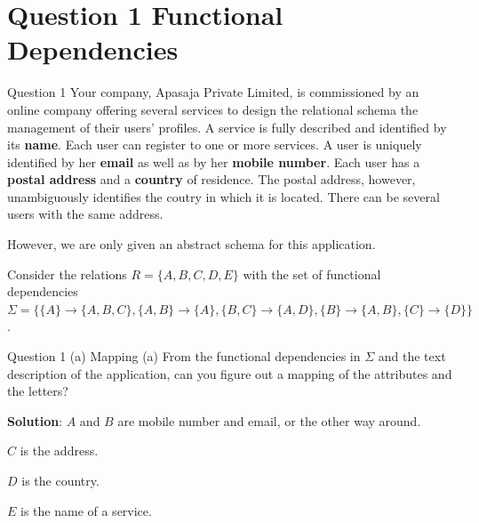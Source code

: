 \section*{Question 1 Functional Dependencies}

\begin{frame}[fragile]{Question 1}
Your company, Apasaja Private Limited, is commissioned by an online company offering several services to design the relational schema the management of their users' profiles. A service is fully described and identified by its \textbf{name}. Each user can register to one or more services. A user is uniquely identified by her \textbf{email} as well as by her \textbf{mobile number}. Each user has a \textbf{postal address} and a \textbf{country} of residence. The postal address, however, unambiguously identifies the coutry in which it is located. There can be several users with the same address.\vspace{5pt}

However, we are only given an abstract schema for this application. \vspace{5pt}

Consider the relations $R=\{A, B, C, D, E\}$ with the set of functional dependencies $\Sigma=\{\{A\} \rightarrow \{A, B, C\}, \{A, B\} \rightarrow \{A\}, \{B, C\} \rightarrow \{A, D\}, \{B\} \rightarrow \{A, B\}, \{C\} \rightarrow \{D\}\}$.\vspace{5pt}
\end{frame}

\begin{frame}[fragile]{Question 1 (a) Mapping}
(a) From the functional dependencies in $\Sigma$ and the text description of the application, can you figure out a mapping of the attributes and the letters? \vspace{15pt}

\textbf{Solution}: $A$ and $B$ are mobile number and email, or the other way around.\vspace{5pt}

$C$ is the address.\vspace{5pt}

$D$ is the country.\vspace{5pt}

$E$ is the name of a service.\vspace{5pt}
\end{frame}


